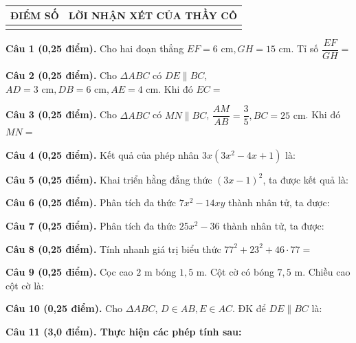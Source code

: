 \documentclass[12pt,a4paper]{article}
\begin{document}
\vspace{1.0mm}

\noindent
\begin{tabularx}{\linewidth}{|p{3.2cm}|X|}
\hline
\centering\textbf{ĐIỂM SỐ} & \centering\textbf{LỜI NHẬN XÉT CỦA THẦY CÔ} \tabularnewline
\hline
\rule{0pt}{1.8cm} & \tabularnewline
\hline
\end{tabularx}

\vspace{1.2mm}
\noindent\textbf{Câu 1 (0,25 điểm).} Cho hai đoạn thẳng $EF = 6\text{ cm}, GH = 15\text{ cm}$. Tỉ số $\dfrac{EF}{GH} =$ \par\vspace{3.0mm}
\noindent\textbf{Câu 2 (0,25 điểm).} Cho $\Delta ABC$ có $DE \parallel BC$, $AD = 3\text{ cm}, DB = 6\text{ cm}, AE = 4\text{ cm}$. Khi đó $EC =$ \par\vspace{3.0mm}
\noindent\textbf{Câu 3 (0,25 điểm).} Cho $\Delta ABC$ có $MN \parallel BC$, $\dfrac{AM}{AB} = \dfrac{3}{5}, BC = 25\text{ cm}$. Khi đó $MN =$ \par\vspace{3.0mm}
\noindent\textbf{Câu 4 (0,25 điểm).} Kết quả của phép nhân $3x(3x^2 - 4x + 1)$ là: \par\vspace{3.0mm}
\noindent\textbf{Câu 5 (0,25 điểm).} Khai triển hằng đẳng thức $(3x - 1)^2$, ta được kết quả là: \par\vspace{3.0mm}
\noindent\textbf{Câu 6 (0,25 điểm).} Phân tích đa thức $7x^2 - 14xy$ thành nhân tử, ta được: \par\vspace{3.0mm}
\noindent\textbf{Câu 7 (0,25 điểm).} Phân tích đa thức $25x^2 - 36$ thành nhân tử, ta được: \par\vspace{3.0mm}
\noindent\textbf{Câu 8 (0,25 điểm).} Tính nhanh giá trị biểu thức $77^2 + 23^2 + 46 \cdot 77 =$ \par\vspace{3.0mm}
\noindent\textbf{Câu 9 (0,25 điểm).} Cọc cao $2\text{ m}$ bóng $1{,}5\text{ m}$. Cột cờ có bóng $7{,}5\text{ m}$. Chiều cao cột cờ là: \par\vspace{3.0mm}
\noindent\textbf{Câu 10 (0,25 điểm).} Cho $\Delta ABC$, $D \in AB, E \in AC$. ĐK để $DE \parallel BC$ là: \par\vspace{3.0mm}
\vspace{0.4mm}
\noindent\textbf{Câu 11 (3,0 điểm). Thực hiện các phép tính sau:}
\vspace{0.6mm}
\end{document}
